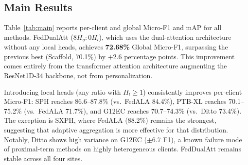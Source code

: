 \documentclass[conference]{IEEEtran}
\begin{document}
{\subsection{Main Results}

Table~\ref{tab:main} reports per-client and global Micro-F1 and mAP for all methods.
FedDualAtt ($8H_g\!:\!0H_l$), which uses the dual-attention architecture without any local heads, achieves \textbf{72.68\%} Global Micro-F1, surpassing the previous best (Scaffold, 70.1\%) by $+2.6$ percentage points.
This improvement comes entirely from the transformer attention architecture augmenting the ResNet1D-34 backbone, not from personalization.

Introducing local heads (any ratio with $H_l \geq 1$) consistently improves per-client Micro-F1: SPH reaches 86.6--87.8\% (vs.\ FedALA 84.4\%), PTB-XL reaches 70.1--75.2\% (vs.\ FedALA 71.7\%), and G12EC reaches 70.7--74.3\% (vs.\ Ditto 73.4\%).
The exception is SXPH, where FedALA (88.2\%) remains the strongest, suggesting that adaptive aggregation is more effective for that distribution.
Notably, Ditto shows high variance on G12EC ($\pm$6.7 F1), a known failure mode of proximal-term methods on highly heterogeneous clients. FedDualAtt remains stable across all four sites.

}
\end{document}
